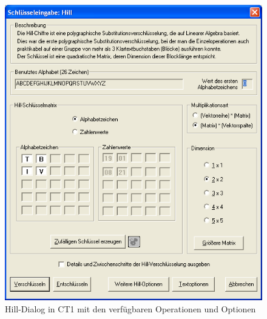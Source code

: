 \begin{refsegment}
\begin{figure}[ht]
\begin{center}
\includegraphics[scale=0.7]{figures/PaP_Fig_Hill-Cipher-CT-Dialog.png}
\caption{Hill-Dialog in CT1 mit den verfügbaren Operationen und Optionen}
\label{PaP_Fig_Hill-Cipher-CT-Dialog}
\end{center}
\end{figure}


\end{refsegment}
